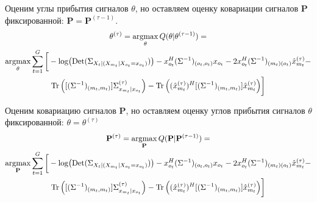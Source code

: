 \documentclass[11pt]{article}
\DeclareMathOperator*{\argmax}{argmax}
\DeclareMathOperator{\Det}{Det}
\begin{document}
\begin{center}
\fontsize{14}{18}\selectfont {}
\end{center}
Оценим углы прибытия сигналов $\theta$, но оставляем оценку ковариации сигналов $\mathbf{P}$ фиксированной: $\mathbf{P} = \mathbf{P}^{(\tau-1)}$.
\begin{equation*}
\begin{gathered}
\theta^{(\tau)}= \argmax_{\theta} Q(\theta | \theta^{(\tau-1)}) = \\
\argmax_{\theta} \sum_{t=1}^G \bigg[ - \log (\Det(\Sigma_{X_t|(X_{m_t}|X_{o_t}=x_{o_t})})) - x_{o_t}^H (\Sigma^{-1})_{(o_t, o_t)}x_{o_t} - 2 x_{o_t}^H (\Sigma^{-1})_{(m_t)(o_t)}\hat{x}_{m_t}^{(\tau)} - \\ \Tr \Big( [(\Sigma^{-1})_{(m_t, m_t)}]\Sigma^{(\tau)}_{x_{m_t}|x_{o_t}} \Big) - \Tr \Big((\hat{x}_{m_t}^{(\tau)})^H[(\Sigma^{-1})_{(m_t, m_t)}]\hat{x}_{m_t}^{(\tau)} \Big) \bigg]
\end{gathered}
\end{equation*}
\begin{center}
\fontsize{14}{18}\selectfont {}
\end{center}
Оценим ковариацию сигналов $\mathbf{P}$, но оставляем оценку углов прибытия сигналов $\theta$ фиксированной: $\theta = \theta^{(\tau)}$
\begin{equation*}
\begin{gathered}
\mathbf{P}^{(\tau)}= \argmax_{\mathbf{P}} Q(\mathbf{P} | \mathbf{P}^{(\tau-1)}) = \\
\argmax_{\mathbf{P}} \sum_{t=1}^G \bigg[ - \log (\Det(\Sigma_{X_t|(X_{m_t}|X_{o_t}=x_{o_t})})) - x_{o_t}^H (\Sigma^{-1})_{(o_t, o_t)}x_{o_t} - 2 x_{o_t}^H (\Sigma^{-1})_{(m_t)(o_t)}\hat{x}_{m_t}^{(\tau)} - \\ \Tr \Big( [(\Sigma^{-1})_{(m_t, m_t)}]\Sigma^{(\tau)}_{x_{m_t}|x_{o_t}} \Big) - \Tr \Big((\hat{x}_{m_t}^{(\tau)})^H[(\Sigma^{-1})_{(m_t, m_t)}]\hat{x}_{m_t}^{(\tau)} \Big) \bigg]
\end{gathered}
\end{equation*}
\clearpage
\begin{center}
\fontsize{16}{20}\selectfont {}
\end{center}
\begin{center}
\fontsize{14}{18}\selectfont {}
\end{center}
\begin{center}
\fontsize{14}{18}\selectfont {}
\end{center}
\begin{center}
\fontsize{14}{18}\selectfont {}
\end{center}
\begin{center}
\fontsize{14}{18}\selectfont {}
\end{center}
\clearpage
\begin{center}
\fontsize{16}{20}\selectfont {}
\end{center}
\end{document}

